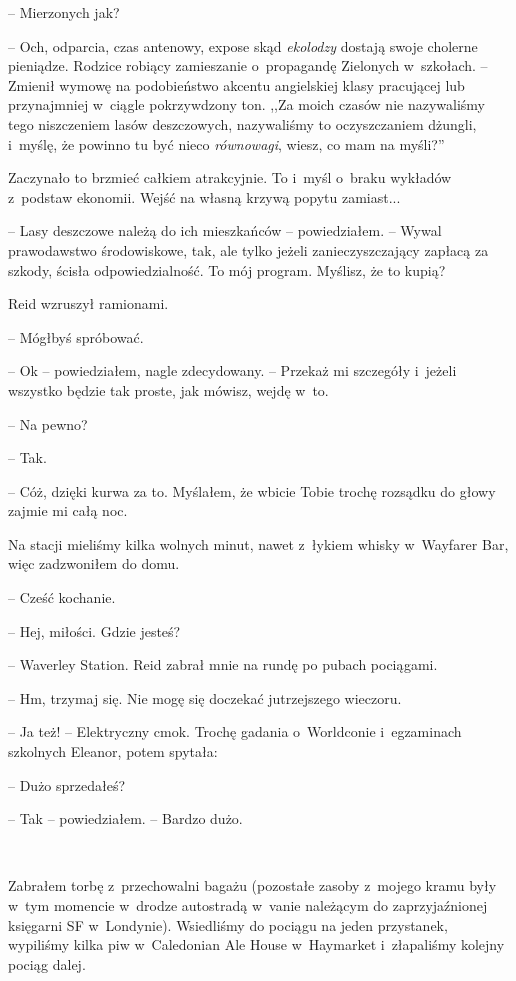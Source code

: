\documentclass[oneside,polish,11pt,sfheadings]{mwbk}
\begin{document}
-- Mierzonych jak?

-- Och, odparcia, czas antenowy, expose skąd \emph{ekolodzy} dostają
swoje cholerne pieniądze. Rodzice robiący zamieszanie o~propagandę
Zielonych w~szkołach. -- Zmienił wymowę na podobieństwo akcentu
angielskiej klasy pracującej lub przynajmniej w~ciągle pokrzywdzony ton.
,,Za moich czasów nie nazywaliśmy tego niszczeniem lasów deszczowych,
nazywaliśmy to oczyszczaniem dżungli, i~myślę, że powinno tu być nieco
\emph{równowagi}, wiesz, co mam na myśli?''

Zaczynało to brzmieć całkiem atrakcyjnie. To i~myśl o~braku wykładów z~podstaw ekonomii. Wejść na własną krzywą popytu zamiast...

-- Lasy deszczowe należą do ich mieszkańców -- powiedziałem. -- Wywal
prawodawstwo środowiskowe, tak, ale tylko jeżeli zanieczyszczający
zapłacą za szkody, ścisła odpowiedzialność. To mój program. Myślisz, że
to kupią?

Reid wzruszył ramionami. 

-- Mógłbyś spróbować.

-- Ok -- powiedziałem, nagle zdecydowany. -- Przekaż mi szczegóły i~jeżeli
wszystko będzie tak proste, jak mówisz, wejdę w~to.

-- Na pewno?

-- Tak.

-- Cóż, dzięki kurwa za to. Myślałem, że wbicie Tobie trochę rozsądku do
głowy zajmie mi całą noc.

Na stacji mieliśmy kilka wolnych minut, nawet z~łykiem whisky w~Wayfarer
Bar, więc zadzwoniłem do domu.

-- Cześć kochanie.

-- Hej, miłości. Gdzie jesteś?

-- Waverley Station. Reid zabrał mnie na rundę po pubach pociągami.

-- Hm, trzymaj się. Nie mogę się doczekać jutrzejszego wieczoru.

-- Ja też! -- Elektryczny cmok. Trochę gadania o~Worldconie i~egzaminach
szkolnych Eleanor, potem spytała:

-- Dużo sprzedałeś?

-- Tak -- powiedziałem. -- Bardzo dużo.

~

Zabrałem torbę z~przechowalni bagażu (pozostałe zasoby z~mojego kramu
były w~tym momencie w~drodze autostradą w~vanie należącym do
zaprzyjaźnionej księgarni SF w~Londynie). Wsiedliśmy do pociągu na jeden
przystanek, wypiliśmy kilka piw w~Caledonian Ale House w~Haymarket i~złapaliśmy kolejny pociąg dalej.
\end{document}
